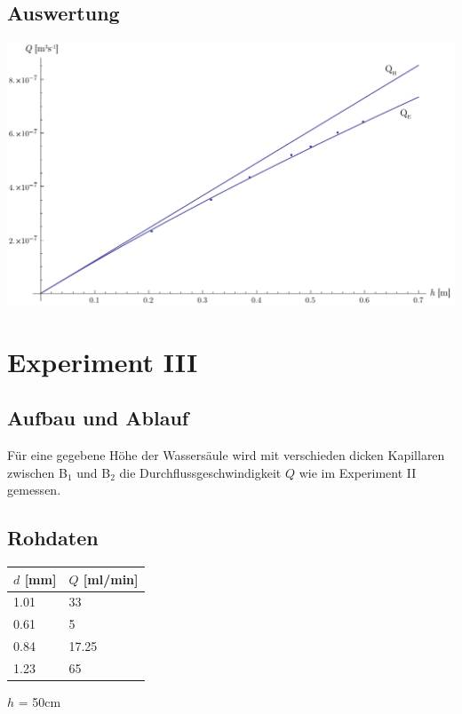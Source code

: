 \documentclass[12pt,a4paper]{article}
\newcommand{\subscript}[1]{$_{#1}$}
\newcommand{\B}[1]{B\subscript{#1}}
\begin{document}
\subsection*{Auswertung}
\begin{center}
\includegraphics[width=15cm]{diagram2.pdf}
\end{center}

\section*{Experiment III}

\subsection*{Aufbau und Ablauf}
F\"ur eine gegebene H\"ohe der Wassers\"aule wird mit verschieden dicken Kapillaren zwischen \B{1} und \B{2} die Durchflussgeschwindigkeit $Q$ wie im Experiment II gemessen.

\subsection*{Rohdaten}
\begin{tabular}{|l|l|}
\hline
$d$ [mm]&$Q$ [ml/min]\\
\hline
1.01&33\\
0.61&5\\
0.84&17.25\\
1.23&65\\
\hline
\end{tabular}

\vspace{5pt}
$h$ = 50cm
\end{document}
